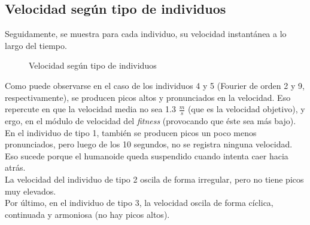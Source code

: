 \documentclass{article}
\begin{document}
\subsection{Velocidad seg\'un tipo de individuos}
Seguidamente, se muestra para cada individuo, su velocidad instant\'anea a lo largo del tiempo.
\begin{figure}[H]%
  \centering
  \caption{Velocidad seg\'un tipo de individuos}%
  \label{fig:resultados_velocidad} %
\end{figure}
\noindent Como puede observarse en el caso de los individuos 4 y 5 (Fourier de orden 2 y 9, respectivamente), se producen picos altos y pronunciados en la velocidad. Eso repercute en que la velocidad media no sea 1.3 $\frac{m}{s}$ (que es la velocidad objetivo), y ergo, en el m\'odulo de velocidad del \textit{fitness} (provocando que \'este sea m\'as bajo).\\
En el individuo de tipo 1, tambi\'en se producen picos un poco menos pronunciados, pero luego de los 10 segundos, no se registra ninguna velocidad. Eso sucede porque el humanoide queda suspendido cuando intenta caer hacia atr\'as.\\
La velocidad del individuo de tipo 2 oscila de forma irregular, pero no tiene picos muy elevados.\\ 
Por \'ultimo, en el individuo de tipo 3, la velocidad oscila de forma c\'iclica, continuada y armoniosa (no hay picos altos).
\end{document}

